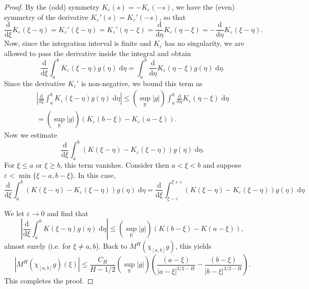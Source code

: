 \documentclass[reqno,12pt]{amsart}
\theoremstyle{plain}%
\theoremstyle{definition}
\begin{document}
\begin{proof}
    By the (odd) symmetry $K_\varepsilon(s) = - K_\varepsilon(-s)$, we have the (even) symmetry of the derivative $K_\varepsilon'(s) = K_\varepsilon'(-s)$, so that
    \[
        \frac{\mathrm{d}}{\mathrm{d}\xi} K_\varepsilon(\xi - \eta) = K_\varepsilon'(\xi - \eta) = K_\varepsilon'(\eta - \xi) = \frac{\mathrm{d}}{\mathrm{d}\eta} K_\varepsilon(\eta - \xi) = - \frac{\mathrm{d}}{\mathrm{d}\eta} K_\varepsilon(\xi - \eta).
    \]
    Now, since the integration interval is finite and $K_\varepsilon$ has no singularity, we are allowed to pass the derivative inside the integral and obtain
    \[
        \frac{\mathrm{d}}{\mathrm{d}\xi} \int_a^b K_\varepsilon(\xi - \eta) g(\eta) \;\mathrm{d}\eta = \int_a^b \frac{\mathrm{d}}{\mathrm{d}\eta} K_\varepsilon(\eta - \xi) g(\eta) \;\mathrm{d}\eta.
    \]
    Since the derivative $K_\varepsilon'$ is non-negative, we bound this term as
    \begin{multline*}
        \left|\frac{\mathrm{d}}{\mathrm{d}\xi} \int_a^b K_\varepsilon(\xi - \eta) g(\eta) \;\mathrm{d}\eta \right| \leq (\sup_\mathbb{R} |g|) \int_a^b \frac{\mathrm{d}}{\mathrm{d}\eta} K_\varepsilon(\eta - \xi) \;\mathrm{d}\eta \\
        = (\sup_\mathbb{R} |g|) \left(K_\varepsilon(b - \xi) - K_\varepsilon(a - \xi)\right).
    \end{multline*}
    Now we estimate
    \[
        \frac{\mathrm{d}}{\mathrm{d}\xi} \int_a^b \left(K(\xi - \eta) - K_\varepsilon(\xi - \eta) \right)g(\eta) \;\mathrm{d}\eta.
    \]
    For $\xi \leq a$ or $\xi \geq b$, this term vanishes. Consider then $a < \xi < b$ and suppose $\varepsilon < \min\{\xi - a, b - \xi\}$. In this case,
    \[
        \frac{\mathrm{d}}{\mathrm{d}\xi} \int_a^b \left(K(\xi - \eta) - K_\varepsilon(\xi - \eta) \right)g(\eta) \;\mathrm{d}\eta = \frac{\mathrm{d}}{\mathrm{d}\xi} \int_{\xi - \varepsilon}^{\xi + \varepsilon} \left(K(\xi - \eta) - K_\varepsilon(\xi - \eta) \right)g(\eta) \;\mathrm{d}\eta    
    \]

    We let $\varepsilon \rightarrow 0$ and find that
    \[
        \left|\frac{\mathrm{d}}{\mathrm{d}\xi} \int_a^b K(\xi - \eta) g(\eta) \;\mathrm{d}\eta \right| \leq (\sup_\mathbb{R} |g|) \left(K(b - \xi) - K(a - \xi)\right),
    \]
    almost surely (i.e. for $\xi \neq a, b$). Back to $M^H (\chi_{[a, b]}g)$, this yields
    \[
        \left|M^H (\chi_{[a, b]}g)(\xi)\right| \leq \frac{C_H}{H - 1/2} (\sup_\mathbb{R} |g|) \left( \frac{(a - \xi)}{|a - \xi|^{3/2 - H}} - \frac{(b - \xi)}{|b - \xi|^{3/2 - H}}\right).
    \]
    This completes the proof.
\end{proof}
\end{document}
